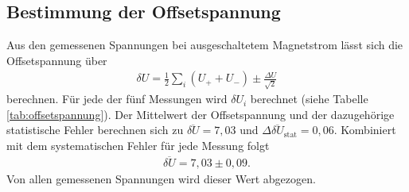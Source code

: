 \subsection{Bestimmung der Offsetspannung}
Aus den gemessenen Spannungen bei ausgeschaltetem Magnetstrom lässt sich die Offsetspannung über
\begin{align*}
  \delta U=\frac{1}{2}\sum_i (U_++U_-) \pm \frac{\Delta U}{\sqrt{2}}
\end{align*}
berechnen. Für jede der fünf Messungen wird $\delta U_i$ berechnet (siehe Tabelle \ref{tab:offsetspannung}). Der Mittelwert der Offsetspannung und der dazugehörige statistische Fehler berechnen sich zu $\overline{\delta U}=7,03$ und $\Delta \overline{\delta U}_\mathrm{stat}=0,06$. Kombiniert mit dem systematischen Fehler für jede Messung folgt 
\begin{align*}
  \overline{\delta U}=7,03 \pm 0,09.
\end{align*} 
Von allen gemessenen Spannungen wird dieser Wert abgezogen.

